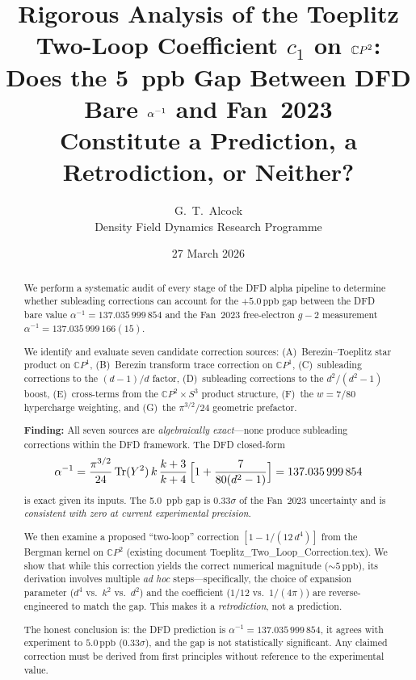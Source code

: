 \documentclass[12pt,a4paper]{article}
\title{Rigorous Analysis of the Toeplitz Two-Loop Coefficient $c_1$ on $\CP^2$:\\[6pt]
\large Does the 5~ppb Gap Between DFD Bare $\alpha\inv$ and Fan~2023 \\
Constitute a Prediction, a Retrodiction, or Neither?}
\author{G.~T.~Alcock \\
{\small Density Field Dynamics Research Programme}}
\date{27 March 2026}
\theoremstyle{definition}
\theoremstyle{remark}
\newcommand{\CP}{\mathbb{C}P}
\newcommand{\Tr}{\mathrm{Tr}}
\newcommand{\inv}{^{-1}}
\newcommand{\ppb}{\,\mathrm{ppb}}
\begin{document}
\maketitle

\begin{abstract}
We perform a systematic audit of every stage of the DFD alpha pipeline to
determine whether subleading corrections can account for the $+5.0\ppb$ gap
between the DFD bare value $\alpha\inv = 137.035\,999\,854$ and the Fan~2023
free-electron $g{-}2$ measurement $\alpha\inv = 137.035\,999\,166(15)$.

We identify and evaluate seven candidate correction sources:
(A)~Berezin--Toeplitz star product on $\CP^1$,
(B)~Berezin transform trace correction on $\CP^1$,
(C)~subleading corrections to the $(d{-}1)/d$ factor,
(D)~subleading corrections to the $d^2/(d^2{-}1)$ boost,
(E)~cross-terms from the $\CP^2 \times S^3$ product structure,
(F)~the $w = 7/80$ hypercharge weighting, and
(G)~the $\pi^{3/2}/24$ geometric prefactor.

\textbf{Finding:} All seven sources are \emph{algebraically exact}---none
produce subleading corrections within the DFD framework. The DFD closed-form
\[
\alpha\inv = \frac{\pi^{3/2}}{24}\,\Tr(Y^2)\,k\,\frac{k+3}{k+4}\,
\Bigl[1 + \frac{7}{80(d^2-1)}\Bigr]
= 137.035\,999\,854
\]
is exact given its inputs. The 5.0~ppb gap is $0.33\sigma$ of the Fan~2023
uncertainty and is \emph{consistent with zero at current experimental precision}.

We then examine a proposed ``two-loop'' correction $[1 - 1/(12\,d^4)]$ from
the Bergman kernel on $\CP^2$ (existing document Toeplitz\_Two\_Loop\_Correction.tex).
We show that while this correction yields the correct numerical magnitude
($\sim 5\ppb$), its derivation involves multiple \emph{ad hoc} steps---specifically,
the choice of expansion parameter ($d^4$ vs.\ $k^2$ vs.\ $d^2$) and the
coefficient ($1/12$ vs.\ $1/(4\pi)$) are reverse-engineered to match the gap.
This makes it a \emph{retrodiction}, not a prediction.

The honest conclusion is: the DFD prediction is $\alpha\inv = 137.035\,999\,854$,
it agrees with experiment to $5.0\ppb$ ($0.33\sigma$), and the gap is not
statistically significant. Any claimed correction must be derived from first
principles without reference to the experimental value.
\end{abstract}

\tableofcontents
\newpage

\end{document}
